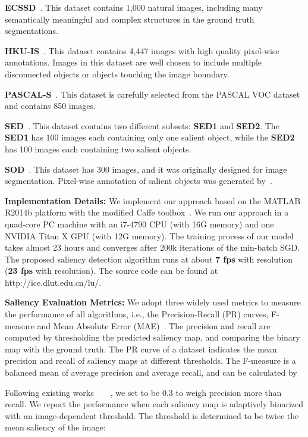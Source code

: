 \documentclass[10pt,twocolumn,letterpaper]{article}
\begin{document}
\textbf{ECSSD}~\cite{yan2013hierarchical}. This dataset contains 1,000 natural images, including many semantically meaningful and complex structures in the ground truth segmentations.

\textbf{HKU-IS}~\cite{zhao2015saliency}. This dataset contains 4,447 images with high quality pixel-wise annotations.
Images in this dataset are well chosen to include multiple disconnected objects or objects touching the image boundary.

\textbf{PASCAL-S}~\cite{li2014secrets}. This dataset is carefully selected from the PASCAL VOC dataset~\cite{Everingham2010ThePV} and contains 850 images.

\textbf{SED}~\cite{borj2015salient}. This dataset contains two different subsets: \textbf{SED1} and \textbf{SED2}.
The \textbf{SED1} has 100 images each containing only one salient object, while the \textbf{SED2} has 100 images each containing two salient objects.

\textbf{SOD}~\cite{yan2013hierarchical}. This dataset has 300 images, and it was originally designed for image segmentation.
Pixel-wise annotation of salient objects was generated by~\cite{jiang2013salient}.


\textbf{Implementation Details:}
We implement our approach based on the MATLAB R2014b platform with the modified Caffe toolbox~\cite{kendall2015bayesian}.
We run our approach in a quad-core PC machine with an i7-4790 CPU (with 16G memory) and one NVIDIA Titan X GPU (with 12G memory).
The training process of our model takes almost 23 hours and converges after 200k iterations of the min-batch SGD.
The proposed saliency detection algorithm runs at about \textbf{7 fps} with  resolution (\textbf{23 fps} with  resolution).
The source code can be found at \textcolor[rgb]{1,0,0}{http://ice.dlut.edu.cn/lu/}.

\textbf{Saliency Evaluation Metrics:}
We adopt three widely used metrics to measure the performance of all algorithms, i.e., the Precision-Recall (PR) curves, F-measure and Mean Absolute Error (MAE)~\cite{borji2015salient}.
The precision and recall are computed by thresholding the predicted saliency map, and comparing the binary map with the ground truth.
The PR curve of a dataset indicates the mean precision and recall of saliency maps at different thresholds.
The F-measure is a balanced mean of average precision and average recall, and can be calculated by

Following existing works~\cite{yan2013hierarchical}~\cite{wang2015deep}~\cite{borji2015salient}~\cite{yang2013saliency}, we set  to be 0.3 to weigh precision more than recall.
We report the performance when each saliency map is adaptively binarized with an image-dependent threshold.
The threshold is determined to be twice the mean saliency of the image:
\end{document}
